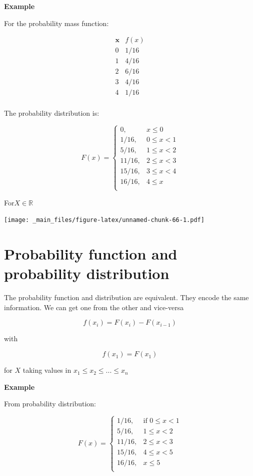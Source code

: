 \documentclass[
]{book}
\begin{document}
\textbf{Example}

For the probability mass function:

\[
\begin{array}{cc}
\mathbf{x} & f(x) \\
0 & 1/16 \\
1 & 4/16 \\
2 & 6/16 \\
3 & 4/16 \\
4 & 1/16 \\
\end{array}
\]

The probability distribution is:

\[
    F(x)=
\begin{cases}
    0, & x \leq 0\\
    1/16,& 0 \leq x < 1\\
    5/16,& 1\leq x < 2\\
    11/16,& 2\leq x < 3\\
    15/16,& 3 \leq x < 4\\
    16/16,&   4 \leq x\\
\end{cases}
\]

For\(X \in \mathbb{R}\)

\texttt{[image: \_main\_files/figure-latex/unnamed-chunk-66-1.pdf]}

\hypertarget{probability-function-and-probability-distribution}{%
\section{Probability function and probability distribution}\label{probability-function-and-probability-distribution}}

The probability function and distribution are equivalent. They encode the same information. We can get one from the other and vice-versa

\[f(x_i)=F(x_i)-F(x_{i-1})\]

with

\[f(x_1)=F(x_1)\]

for \(X\) taking values in \(x_1 \leq x_2 \leq ... \leq x_n\)

\textbf{Example}

From probability distribution:

\[
    F(x)=
\begin{cases}
    1/16,& \text{if } 0 \leq x < 1\\
    5/16,& 1\leq x < 2\\
    11/16,& 2\leq x < 3\\
    15/16,& 4\leq x < 5\\
    16/16,&  x \leq 5\\
\end{cases}
\]
\end{document}
